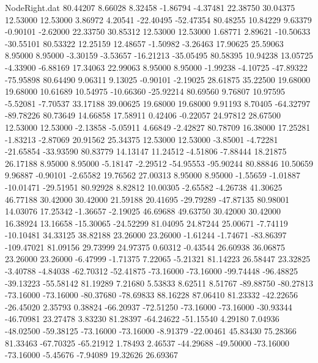 \begin{filecontents}{NodeRight.dat}
  80.44207    8.66028    8.32458    -1.86794   -4.37481   22.38750   30.04375   12.53000   12.53000    3.86972    4.20541  -22.40495  -52.47354
  80.48255   10.84229    9.63379    -0.90101   -2.62000   22.33750   30.85312   12.53000   12.53000    1.68771    2.89621  -10.50633  -30.55101
  80.53322   12.25159   12.48657    -1.50982   -3.26463   17.90625   25.59063    8.95000    8.95000   -3.30159   -3.53657  -16.21213  -35.05495
  80.58395   10.94238   13.05725    -4.33900   -6.88169   17.34063   22.99063    8.95000    8.95000   -1.99238   -4.10725  -47.89322  -75.95898
  80.64490    9.06311    9.13025    -0.90101   -2.19025   28.61875   35.22500   19.68000   19.68000   10.61689   10.54975  -10.66360  -25.92214
  80.69560    9.76807   10.97595    -5.52081   -7.70537   33.17188   39.00625   19.68000   19.68000    9.91193    8.70405  -64.32797  -89.78226
  80.73649   14.66858   17.58911     0.42406   -0.22057   24.97812   28.67500   12.53000   12.53000   -2.13858   -5.05911    4.66849   -2.42827
  80.78709   16.38000   17.25281    -1.83213   -2.87069   20.91562   25.34375   12.53000   12.53000   -3.85001   -4.72281  -21.65854  -33.93590
  80.83779   14.13147   11.24512    -4.51806   -7.88444   18.21875   26.17188    8.95000    8.95000   -5.18147   -2.29512  -54.95553  -95.90244
  80.88846   10.50659    9.96887    -0.90101   -2.65582   19.76562   27.00313    8.95000    8.95000   -1.55659   -1.01887  -10.01471  -29.51951
  80.92928    8.82812   10.00305    -2.65582   -4.26738   41.30625   46.77188   30.42000   30.42000   21.59188   20.41695  -29.79289  -47.87135
  80.98001   14.03076   17.25342    -1.36657   -2.19025   46.69688   49.63750   30.42000   30.42000   16.38924   13.16658  -15.30065  -24.52299
  81.04095   24.87244   25.00671    -7.74119  -10.10481   34.33125   38.82188   23.26000   23.26000   -1.61244   -1.74671  -83.86397 -109.47021
  81.09156   29.73999   24.97375     0.60312   -0.43544   26.60938   36.06875   23.26000   23.26000   -6.47999   -1.71375    7.22065   -5.21321
  81.14223   26.58447   23.32825    -3.40788   -4.84038  -62.70312  -52.41875  -73.16000  -73.16000  -99.74448  -96.48825  -39.13223  -55.58142
  81.19289    7.21680    5.53833     8.62511    8.51767  -89.88750  -80.27813  -73.16000  -73.16000  -80.37680  -78.69833   88.16228   87.06410
  81.23332  -42.22656  -26.45020     2.35793    0.38824  -66.20937  -72.51250  -73.16000  -73.16000  -30.93344  -46.70981   23.27478    3.83230
  81.28397  -64.24622  -51.15540     4.29180    7.04936  -48.02500  -59.38125  -73.16000  -73.16000   -8.91379  -22.00461   45.83430   75.28366
  81.33463  -67.70325  -65.21912     1.78493    2.46537  -44.29688  -49.50000  -73.16000  -73.16000   -5.45676   -7.94089   19.32626   26.69367

\end{filecontents}
